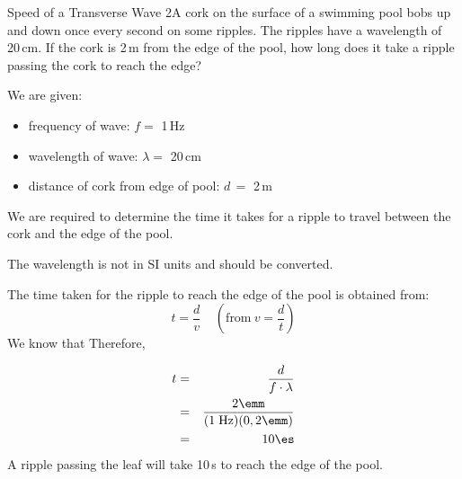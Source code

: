 \begin{wex}{Speed of a Transverse Wave 2}{A cork on the surface of a swimming pool bobs up and down once every second on some ripples. The ripples have a wavelength of 20\,cm. If the cork is 2\,m from the edge of the pool, how long does it take a ripple passing the cork to reach the edge?}{
We are given:
\begin{itemize}
\item{frequency of wave: $f =$ 1\,Hz}
\item{wavelength of wave: $\lambda =$ 20\,cm}
\item{distance of cork from edge of pool: $d\,=$ 2\,m}
\end{itemize}
We are required to determine the time it takes for a ripple to travel between the cork and the edge of the pool.

The wavelength is not in SI units and should be converted.

The time taken for the ripple to reach the edge of the pool is obtained from:
$$t=\frac{d}{v} \ \ \ \ \ (\text{from}\ v=\frac{d}{t})$$
We know that
Therefore,


\begin{eqnarray*}
t&=&\frac{d}{f\cdot \lambda}\\
&=&\frac{2\emm}{(1\;\mathrm{Hz})(0,2\emm)}\\
&=&10\es
\end{eqnarray*}
A ripple passing the leaf will take 10\,s to reach the edge of the pool.}
\end{wex}

